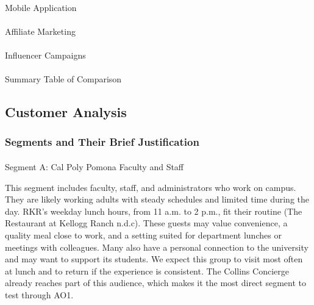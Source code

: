 \documentclass[
  12pt,
  letterpaper,
  DIV=11,
  numbers=noendperiod]{scrartcl}
\makeatletter
\let\oldparagraph\paragraph
\renewcommand{\paragraph}{
    \@ifstar
      \xxxParagraphStar
      \xxxParagraphNoStar
  }
\newcommand{\xxxParagraphStar}[1]{\oldparagraph*{#1}\mbox{}}
\newcommand{\xxxParagraphNoStar}[1]{\oldparagraph{#1}\mbox{}}
\makeatother
\begin{document}
\paragraph{Mobile Application}\label{mobile-application-1}

\paragraph{Affiliate Marketing}\label{affiliate-marketing-1}

\paragraph{Influencer Campaigns}\label{influencer-campaigns-1}

\paragraph{Summary Table of
Comparison}\label{summary-table-of-comparison}

\subsection{Customer Analysis}\label{customer-analysis}

\subsubsection{Segments and Their Brief
Justification}\label{segments-and-their-brief-justification}

\paragraph{Segment A: Cal Poly Pomona Faculty and
Staff}\label{segment-a-cal-poly-pomona-faculty-and-staff}

This segment includes faculty, staff, and administrators who work on
campus. They are likely working adults with steady schedules and limited
time during the day. RKR's weekday lunch hours, from 11 a.m. to 2 p.m.,
fit their routine (The Restaurant at Kellogg Ranch n.d.c). These guests
may value convenience, a quality meal close to work, and a setting
suited for department lunches or meetings with colleagues. Many also
have a personal connection to the university and may want to support its
students. We expect this group to visit most often at lunch and to
return if the experience is consistent. The Collins Concierge already
reaches part of this audience, which makes it the most direct segment to
test through AO1.
\end{document}

